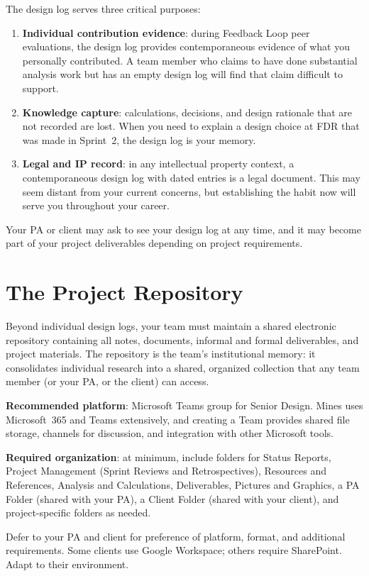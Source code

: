 The design log serves three critical purposes:
\begin{enumerate}[nosep,leftmargin=1.5em]
\item \textbf{Individual contribution evidence}: during Feedback Loop peer evaluations, the design log provides contemporaneous evidence of what you personally contributed. A team member who claims to have done substantial analysis work but has an empty design log will find that claim difficult to support.
\item \textbf{Knowledge capture}: calculations, decisions, and design rationale that are not recorded are lost. When you need to explain a design choice at FDR that was made in Sprint~2, the design log is your memory.
\item \textbf{Legal and IP record}: in any intellectual property context, a contemporaneous design log with dated entries is a legal document. This may seem distant from your current concerns, but establishing the habit now will serve you throughout your career.
\end{enumerate}

Your PA or client may ask to see your design log at any time, and it may become part of your project deliverables depending on project requirements.


\section{The Project Repository}
Beyond individual design logs, your team must maintain a shared electronic repository containing all notes, documents, informal and formal deliverables, and project materials. The repository is the team's institutional memory: it consolidates individual research into a shared, organized collection that any team member (or your PA, or the client) can access.

\textbf{Recommended platform}: Microsoft Teams group for Senior Design. Mines uses Microsoft~365 and Teams extensively, and creating a Team provides shared file storage, channels for discussion, and integration with other Microsoft tools.

\textbf{Required organization}: at minimum, include folders for Status Reports, Project Management (Sprint Reviews and Retrospectives), Resources and References, Analysis and Calculations, Deliverables, Pictures and Graphics, a PA Folder (shared with your PA), a Client Folder (shared with your client), and project-specific folders as needed.

Defer to your PA and client for preference of platform, format, and additional requirements. Some clients use Google Workspace; others require SharePoint. Adapt to their environment.

